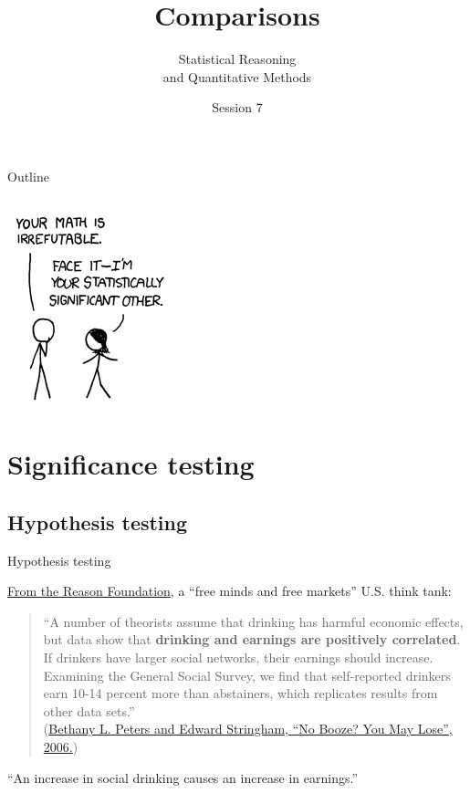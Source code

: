 \documentclass{beamer}
\author{Statistical Reasoning\\and Quantitative Methods}
\title{Comparisons}
\institute{François Briatte \& Ivaylo Petev}
\date{Session 7}
\begin{document}
		
	\begin{frame}[t,plain]
		\titlepage
	\end{frame}
	
	\begin{frame}[t]{Outline}
		
		\begin{columns}[T]
			\tableofcontents[hideallsubsections]
		\end{columns}

		\vspace{1em}
		
		\begin{center}
		\href{http://languagelog.ldc.upenn.edu/nll/?p=1107}{\includegraphics[scale=.35]{images/xkcd-boyfriend.jpg}}	
		\end{center}
					
	\end{frame}

	\section{Significance testing}

	\subsection{Hypothesis testing}

	\begin{frame}[t]{Hypothesis testing}
		
		\href{http://reason.org/}{From the Reason Foundation}, a ``free minds and free markets'' U.S. think tank:
			
		\begin{quote}
		``A number of theorists assume that drinking has harmful economic effects, but data show that \textbf{drinking and earnings are positively correlated}. \textbf{} If drinkers have larger social networks, their earnings should increase. Examining the General Social Survey, we find that self-reported drinkers earn 10-14 percent more than abstainers, which replicates results from other data sets.''\\
		(\href{http://reason.org/news/show/127594.html}{Bethany L. Peters and Edward Stringham, ``No Booze? You May Lose'', 2006.})
		\end{quote}

		 ``An increase in social drinking causes an increase in earnings.''
	\end{frame}
\end{document}
